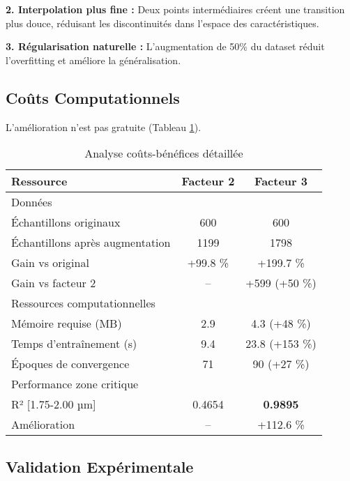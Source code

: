 \documentclass[11pt,a4paper,twocolumn]{article}
\begin{document}
\textbf{2. Interpolation plus fine :} Deux points intermédiaires créent une transition plus douce, réduisant les discontinuités dans l'espace des caractéristiques.

\textbf{3. Régularisation naturelle :} L'augmentation de 50\% du dataset réduit l'overfitting et améliore la généralisation.
\vspace{10cm}
\subsection{Coûts Computationnels}

L'amélioration n'est pas gratuite (Tableau \ref{tab:costs}).

\begin{table}[H]
  \centering
  \caption{Analyse coûts-bénéfices détaillée}
  \label{tab:costs}
  \begin{adjustbox}{max width=\columnwidth}
    \begin{tabular}{@{}lcc@{}}
      \toprule
      Ressource & Facteur 2 & Facteur 3 \\
      \midrule
      Données \\
      Échantillons originaux & 600 & 600 \\
      Échantillons après augmentation & 1199 & 1798 \\
      Gain vs original & +99.8 \% & +199.7 \% \\
      Gain vs facteur 2 & – & +599 (+50 \%) \\
      \addlinespace
      Ressources computationnelles \\
      Mémoire requise (MB) & 2.9 & 4.3 (+48 \%) \\
      Temps d’entraînement (s) & 9.4 & 23.8 (+153 \%) \\
      Époques de convergence & 71 & 90 (+27 \%) \\
      \addlinespace
      Performance zone critique \\
      R² [1.75-2.00 µm] & 0.4654 & \textbf{0.9895} \\
      Amélioration & – & +112.6 \% \\
      \bottomrule
    \end{tabular}
  \end{adjustbox}
\end{table}

\subsection{Validation Expérimentale}
\end{document}
